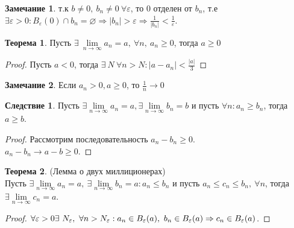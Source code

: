 \documentclass[a4paper, 12pt]{article}
\renewcommand{\epsilon}{\varepsilon}
\renewcommand{\emptyset}{\varnothing}
\newcommand{\lims}{\lim\limits_{n\to \infty}}
\theoremstyle{definition}
\newtheorem*{theorem}{Теорема}
\newtheorem*{consequense}{Следствие}
\newtheorem*{comm}{Замечание}
\begin{document}
        \begin{comm}
            т.к $b\ne 0,\ b_n\ne 0\ \forall \epsilon$, то 0 отделен от $b_n$, т.е $\exists \epsilon>0: B_{\epsilon}(0)\cap b_n=\emptyset \Rightarrow |b_n|>\epsilon \Rightarrow \frac{1}{|b_n|}<\frac{1}{\epsilon}$.
        \end{comm}
        \begin{theorem}
            Пусть $\exists\ \lims a_n=a,\ \forall n,\ a_n\geq 0$, тогда $a\geq 0$
        \end{theorem} 
        \begin{proof}
            Пусть $a<0$, тогда $\exists\ N\ \forall n>N: |a-a_n|<\frac{|a|}{3}$
        \end{proof} 
        \begin{comm}
            Если $a_n>0, a\geq 0$, то $\frac{1}{n}\to 0$
        \end{comm}
        \begin{consequense}
            Пусть $\exists \lims a_n =a, \exists \lims b_n=b$ и пусть $\forall n: a_n\geq b_n$, тогда $a\geq b$.
        \end{consequense}  
        \begin{proof}
            Рассмотрим последовательность $a_n-b_n\geq 0$.\\ $a_n-b_n\to a-b\geq 0$.
        \end{proof} 
        \begin{theorem} (Лемма о двух миллиционерах)\\
            Пусть $\exists \lims a_n =a,\ \exists \lims b_n=a: a_n\leq b_n$ и пусть $a_n\leq c_n\leq b_n,\ \forall n$, тогда $\exists \lims c_n=a$.
        \end{theorem} 
        \begin{proof}
            $\forall \epsilon>0 \exists \ N_{\epsilon},\ \forall n>N_{\epsilon}: a_n\in B_{\epsilon}(a),\ b_n\in B_{\epsilon}(a)\\
            \Rightarrow c_n\in B_{\epsilon}(a)$.
        \end{proof}
\end{document}
